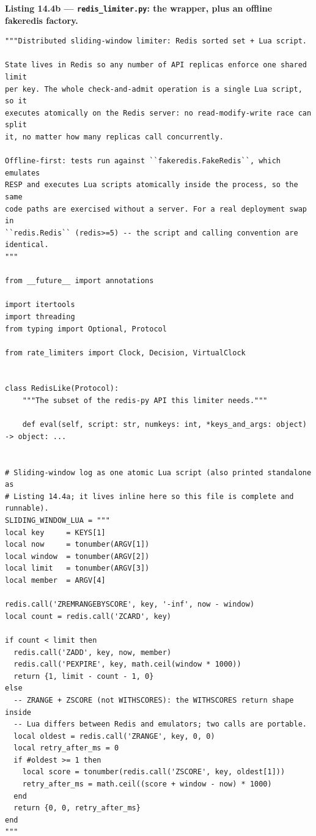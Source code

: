 \noindent\textbf{Listing 14.4b --- \texttt{redis\_limiter.py}: the wrapper,
plus an offline fakeredis factory.}
\label{lst:ch14-redis}
\begin{verbatim}
"""Distributed sliding-window limiter: Redis sorted set + Lua script.

State lives in Redis so any number of API replicas enforce one shared limit
per key. The whole check-and-admit operation is a single Lua script, so it
executes atomically on the Redis server: no read-modify-write race can split
it, no matter how many replicas call concurrently.

Offline-first: tests run against ``fakeredis.FakeRedis``, which emulates
RESP and executes Lua scripts atomically inside the process, so the same
code paths are exercised without a server. For a real deployment swap in
``redis.Redis`` (redis>=5) -- the script and calling convention are
identical.
"""

from __future__ import annotations

import itertools
import threading
from typing import Optional, Protocol

from rate_limiters import Clock, Decision, VirtualClock


class RedisLike(Protocol):
    """The subset of the redis-py API this limiter needs."""

    def eval(self, script: str, numkeys: int, *keys_and_args: object) -> object: ...


# Sliding-window log as one atomic Lua script (also printed standalone as
# Listing 14.4a; it lives inline here so this file is complete and runnable).
SLIDING_WINDOW_LUA = """
local key     = KEYS[1]
local now     = tonumber(ARGV[1])
local window  = tonumber(ARGV[2])
local limit   = tonumber(ARGV[3])
local member  = ARGV[4]

redis.call('ZREMRANGEBYSCORE', key, '-inf', now - window)
local count = redis.call('ZCARD', key)

if count < limit then
  redis.call('ZADD', key, now, member)
  redis.call('PEXPIRE', key, math.ceil(window * 1000))
  return {1, limit - count - 1, 0}
else
  -- ZRANGE + ZSCORE (not WITHSCORES): the WITHSCORES return shape inside
  -- Lua differs between Redis and emulators; two calls are portable.
  local oldest = redis.call('ZRANGE', key, 0, 0)
  local retry_after_ms = 0
  if #oldest >= 1 then
    local score = tonumber(redis.call('ZSCORE', key, oldest[1]))
    retry_after_ms = math.ceil((score + window - now) * 1000)
  end
  return {0, 0, retry_after_ms}
end
"""



\end{verbatim}
